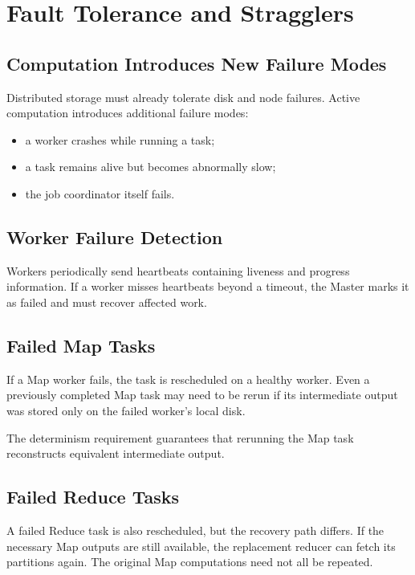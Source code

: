 \documentclass[11pt,a4paper,oneside]{book}
\begin{document}
\section{Fault Tolerance and Stragglers}

\subsection{Computation Introduces New Failure Modes}

Distributed storage must already tolerate disk and node failures. Active computation introduces additional failure modes:

\begin{itemize}
    \item a worker crashes while running a task;
    \item a task remains alive but becomes abnormally slow;
    \item the job coordinator itself fails.
\end{itemize}

\subsection{Worker Failure Detection}

Workers periodically send heartbeats containing liveness and progress information. If a worker misses heartbeats beyond a timeout, the Master marks it as failed and must recover affected work.

\subsection{Failed Map Tasks}

If a Map worker fails, the task is rescheduled on a healthy worker. Even a previously completed Map task may need to be rerun if its intermediate output was stored only on the failed worker's local disk.

The determinism requirement guarantees that rerunning the Map task reconstructs equivalent intermediate output.

\subsection{Failed Reduce Tasks}

A failed Reduce task is also rescheduled, but the recovery path differs. If the necessary Map outputs are still available, the replacement reducer can fetch its partitions again. The original Map computations need not all be repeated.
\end{document}
